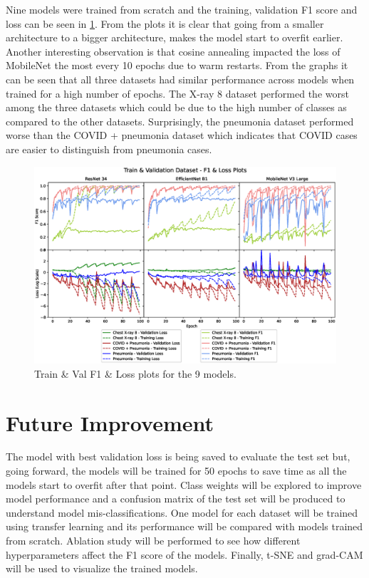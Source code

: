 \documentclass[10pt,twocolumn,letterpaper]{article}
\begin{document}
Nine models were trained from scratch and the training, validation F1 score and loss can be seen in \cref{fig:acc_loss_sep}. From the plots it is clear that going from a smaller architecture to a bigger architecture, makes the model start to overfit earlier. Another interesting observation is that cosine annealing impacted the loss of MobileNet the most every 10 epochs due to warm restarts. From the graphs it can be seen that all three datasets had similar performance across models when trained for a high number of epochs. The X-ray 8 dataset performed the worst among the three datasets which could be due to the high number of classes as compared to the other datasets. Surprisingly, the pneumonia dataset performed worse than the COVID + pneumonia dataset which indicates that COVID cases are easier to distinguish from pneumonia cases. 

\begin{figure}[t]
  \centering
  \includegraphics[width=1\linewidth]{f1_loss_separate.eps}  
   \caption{Train \& Val F1 \& Loss plots for the 9 models.}
   \vspace{-1em}
   \label{fig:acc_loss_sep}
\end{figure}

\section{Future Improvement}
\label{sec:future}
The model with best validation loss is being saved to evaluate the test set but, going forward, the models will be trained for 50 epochs to save time as all the models start to overfit after that point. Class weights will be explored to improve model performance and a confusion matrix of the test set will be produced to understand model mis-classifications. One model for each dataset will be trained using transfer learning and its performance will be compared with models trained from scratch. Ablation study will be performed to see how different hyperparameters affect the F1 score of the models. Finally, t-SNE \cite{van2008visualizing} and grad-CAM \cite{jacobgilpytorchcam} will be used to visualize the trained models.

\clearpage
{\small


}
\end{document}
